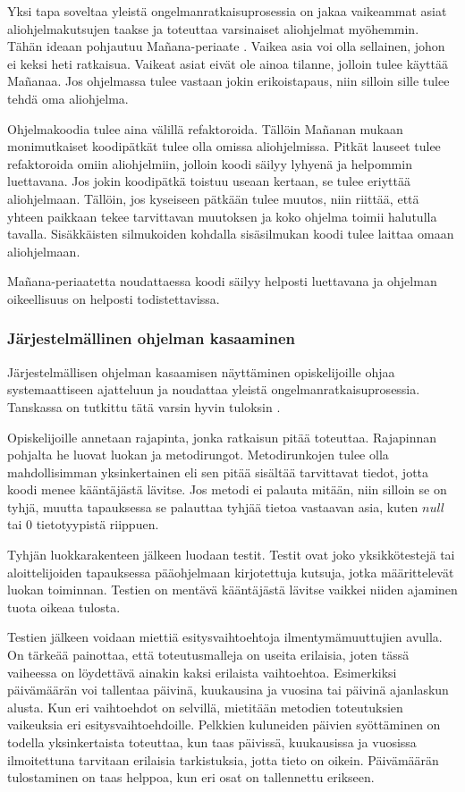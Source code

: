 Yksi tapa soveltaa yleistä ongelmanratkaisuprosessia on jakaa vaikeammat asiat
aliohjelmakutsujen taakse ja toteuttaa varsinaiset aliohjelmat myöhemmin. Tähän
ideaan pohjautuu Mañana-periaate \cite{Caspersen:2006:NPO:1176617.1176741}.
Vaikea asia voi olla sellainen, johon ei keksi heti ratkaisua. Vaikeat asiat
eivät ole ainoa tilanne, jolloin tulee käyttää Mañanaa. Jos ohjelmassa tulee
vastaan jokin erikoistapaus, niin silloin sille tulee tehdä oma aliohjelma.

Ohjelmakoodia tulee aina välillä refaktoroida. Tällöin Mañanan mukaan
monimutkaiset koodipätkät tulee olla omissa aliohjelmissa. Pitkät lauseet tulee
refaktoroida omiin aliohjelmiin, jolloin koodi säilyy lyhyenä ja helpommin
luettavana. Jos jokin koodipätkä toistuu useaan kertaan, se tulee eriyttää
aliohjelmaan. Tällöin, jos kyseiseen pätkään tulee muutos, niin riittää, että
yhteen paikkaan tekee tarvittavan muutoksen ja koko ohjelma toimii halutulla
tavalla. Sisäkkäisten silmukoiden kohdalla sisäsilmukan koodi tulee laittaa
omaan aliohjelmaan.

Mañana-periaatetta noudattaessa koodi säilyy helposti luettavana ja ohjelman
oikeellisuus on helposti todistettavissa.

\subsubsection{Järjestelmällinen ohjelman kasaaminen}

Järjestelmällisen ohjelman kasaamisen näyttäminen opiskelijoille ohjaa
systemaattiseen ajatteluun ja noudattaa yleistä ongelmanratkaisuprosessia.
Tanskassa on tutkittu tätä varsin hyvin tuloksin
\cite{Caspersen:2006:NPO:1176617.1176741}.

Opiskelijoille annetaan rajapinta, jonka ratkaisun pitää toteuttaa. Rajapinnan
pohjalta he luovat luokan ja metodirungot. Metodirunkojen tulee olla
mahdollisimman yksinkertainen eli sen pitää sisältää tarvittavat tiedot, jotta
koodi menee kääntäjästä lävitse. Jos metodi ei palauta mitään, niin silloin se
on tyhjä, muutta tapauksessa se palauttaa tyhjää tietoa vastaavan asia, kuten
$null$ tai $0$ tietotyypistä riippuen.

Tyhjän luokkarakenteen jälkeen luodaan testit. Testit ovat joko yksikkötestejä
tai aloittelijoiden tapauksessa pääohjelmaan kirjotettuja kutsuja, jotka
määrittelevät luokan toiminnan. Testien on mentävä kääntäjästä lävitse vaikkei
niiden ajaminen tuota oikeaa tulosta.

Testien jälkeen voidaan miettiä esitysvaihtoehtoja ilmentymämuuttujien avulla.
On tärkeää painottaa, että toteutusmalleja on useita erilaisia, joten tässä
vaiheessa on löydettävä ainakin kaksi erilaista vaihtoehtoa. Esimerkiksi
päivämäärän voi tallentaa päivinä, kuukausina ja vuosina tai päivinä ajanlaskun
alusta. Kun eri vaihtoehdot on selvillä, mietitään metodien toteutuksien
vaikeuksia eri esitysvaihtoehdoille. Pelkkien kuluneiden päivien syöttäminen on
todella yksinkertaista toteuttaa, kun taas päivissä, kuukausissa ja vuosissa
ilmoitettuna tarvitaan erilaisia tarkistuksia, jotta tieto on oikein.
Päivämäärän tulostaminen on taas helppoa, kun eri osat on tallennettu erikseen.

